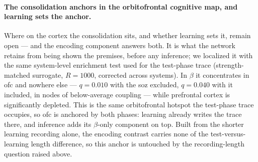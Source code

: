 \paragraph{The consolidation anchors in the orbitofrontal cognitive map, and learning sets the anchor.}
Where on the cortex the consolidation sits, and whether learning sets it, remain open --- and the encoding component answers both. It is what the network retains from being shown the premises, before any inference; we localized it with the same system-level enrichment test used for the test-phase trace (strength-matched surrogate, \(R = 1000\), corrected across systems). In \(\beta\) it concentrates in \gls{ofc} and nowhere else --- \(q = 0.010\) with the \gls{soz} excluded, \(q = 0.040\) with it included, in nodes of below-average coupling --- while prefrontal cortex is significantly depleted. This is the same orbitofrontal hotspot the test-phase trace occupies, so \gls{ofc} is anchored by both phases: learning already writes the trace there, and inference adds its \(\beta\)-only component on top. Built from the shorter learning recording alone, the encoding contrast carries none of the test-versus-learning length difference, so this anchor is untouched by the recording-length question raised above.
